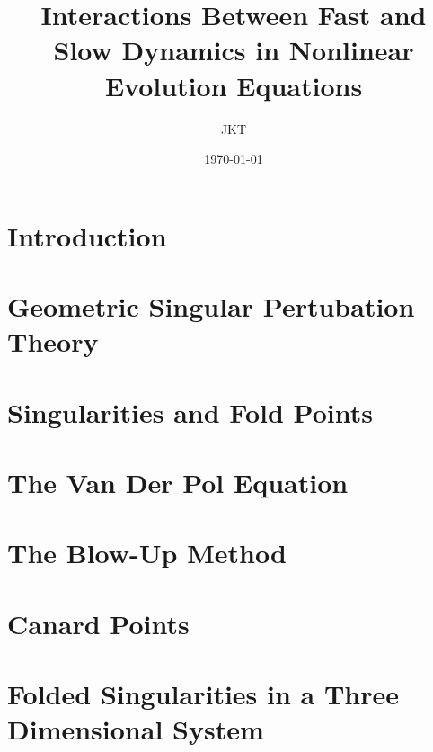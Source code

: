 \documentclass{article}
\title{Interactions Between Fast and Slow Dynamics in Nonlinear Evolution Equations}
\author{JKT}
\date{\today}
\begin{document}
\maketitle
\newpage
{} %
\tableofcontents
\newpage
\listoffigures

\newpage
{} %
\pagestyle{fancy}

\begin{abstract}
	
\end{abstract}


\section{Introduction}\label{Intro}


\section{Geometric Singular Pertubation Theory} \label{GSPT}


\section{Singularities and Fold Points}\label{sec:singularitiesandfoldpoints}



\section{The Van Der Pol Equation}\label{sec:the-van-der-pol-equation}



\section{The Blow-Up Method}\label{sec: VDP Blowup}


\section{Canard Points}\label{sec:canard-points}



\section{Folded Singularities in a Three Dimensional System} \label{sec: threedimfolds}

\end{document}
